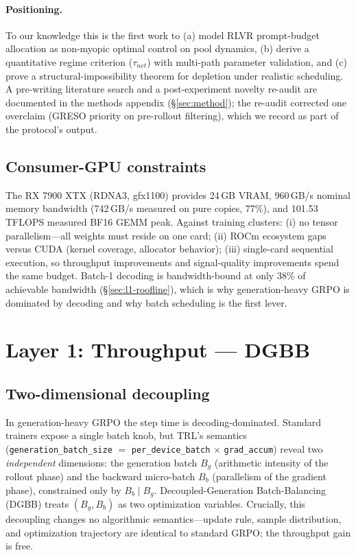 \documentclass[11pt]{article}
\theoremstyle{definition}
\begin{document}
\paragraph{Positioning.} To our knowledge this is the first work to (a) model RLVR
prompt-budget allocation as non-myopic optimal control on pool dynamics, (b) derive
a quantitative regime criterion ($\tau_{net}$) with multi-path parameter
validation, and (c) prove a structural-impossibility theorem for depletion under
realistic scheduling. A pre-writing literature search and a post-experiment
novelty re-audit are documented in the methods appendix (\S\ref{sec:method}); the
re-audit corrected one overclaim (GRESO priority on pre-rollout filtering), which
we record as part of the protocol's output.

\subsection{Consumer-GPU constraints}\label{sec:bg-hw}
The RX 7900 XTX (RDNA3, gfx1100) provides 24\,GB VRAM, 960\,GB/s nominal memory
bandwidth (742\,GB/s measured on pure copies, 77\%), and 101.53\,TFLOPS measured
BF16 GEMM peak. Against training clusters: (i) no tensor parallelism---all weights
must reside on one card; (ii) ROCm ecosystem gaps versus CUDA (kernel coverage,
allocator behavior); (iii) single-card sequential execution, so throughput
improvements and signal-quality improvements spend the same budget. Batch-1
decoding is bandwidth-bound at only 38\% of achievable bandwidth
(\S\ref{sec:l1-roofline}), which is why generation-heavy GRPO is dominated by
decoding and why batch scheduling is the first lever.


\section{Layer 1: Throughput --- DGBB}\label{sec:l1}

\subsection{Two-dimensional decoupling}\label{sec:l1-decouple}
In generation-heavy GRPO the step time is decoding-dominated. Standard trainers
expose a single batch knob, but TRL's semantics (\texttt{generation\_batch\_size}
$=$ \texttt{per\_device\_batch} $\times$ \texttt{grad\_accum}) reveal two
\emph{independent} dimensions: the generation batch $B_g$ (arithmetic intensity of
the rollout phase) and the backward micro-batch $B_b$ (parallelism of the gradient
phase), constrained only by $B_b \mid B_g$. Decoupled-Generation Batch-Balancing
(DGBB) treats $(B_g, B_b)$ as two optimization variables. Crucially, this
decoupling changes no algorithmic semantics---update rule, sample distribution,
and optimization trajectory are identical to standard GRPO; the throughput gain is
free.
\end{document}
